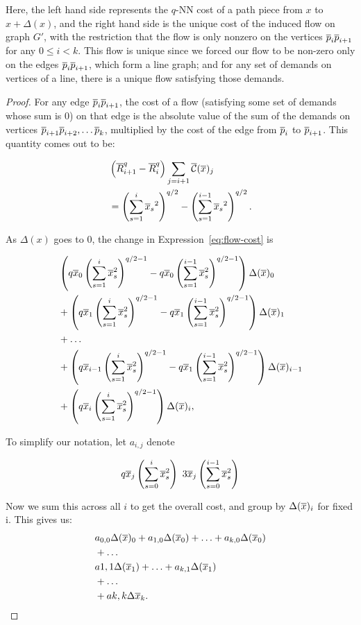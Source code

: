 Here, the left hand side represents the $q$-NN cost of a path piece from
$x$ to $x+\Delta(x)$, and the right hand side is the unique cost of the
induced flow on graph $G'$, with the restriction that the flow is only
nonzero on the vertices $\overline{p}_i\overline{p}_{i+1}$ for any $0 \leq i < k$. This flow
is unique since we forced our flow to be non-zero only on the edges
$\overline{p}_i\overline{p}_{i+1}$, which form a line graph; and for any set of demands on
vertices of a line, there is a unique flow satisfying those demands.

\begin{proof} For any edge $\overline{p}_i\overline{p}_{i+1}$, the cost of a flow (satisfying
some set of demands whose sum is $0$) on that edge is the absolute value of
the sum of the demands on vertices $\overline{p}_{i+1} \overline{p}_{i+2}, \ldots \overline{p}_k$,
multiplied by the cost of the edge from $\overline{p}_i$ to $\overline{p}_{i+1}$. This
quantity comes out to be:

\begin{align} &\left(\overline{R}_{i+1}^q-\overline{R}_{i}^q \right) \sum_{j=i+1} \overline{\mathcal{C}}(\overline{x})_j
\\
\label{eq:flow-cost}
&=\left(\sum_{s=1}^i {\overline{x}_s}^2\right)^{q/2} -\left(\sum_{s=1}^{i-1}
{\overline{x}_s}^2\right)^{q/2}.
\end{align}

As $\Delta(x)$ goes to $0$, the change in Expression~\ref{eq:flow-cost} is

\begin{align}
&
\left(q\overline{x}_0 \left(\sum_{s=1}^i \overline{x}_s^2 \right)^{q/2-1} -
q\overline{x}_0\left(\sum_{s=1}^{i-1} \overline{x}_s^2 \right)^{q/2-1} \right) \Delta(\overline{x})_0
\\
&+
\left(q\overline{x}_1 \left(\sum_{s=1}^i \overline{x}_s^2 \right)^{q/2-1} -
q\overline{x}_1\left(\sum_{s=1}^{i-1}\overline{x}_s^2 \right)^{q/2-1} \right) \Delta(\overline{x})_1
\\
&+ \ldots
\\
&+
\left(q\overline{x}_{i-1} \left(\sum_{s=1}^i \overline{x}_s^2 \right)^{q/2-1} -
q\overline{x}_1\left(\sum_{s=1}^{i-1}\overline{x}_s^2 \right)^{q/2-1}
\right)\Delta(\overline{x})_{i-1}
\\
&+
\left(q\overline{x}_i \left(\sum_{s=1}^i \overline{x}_s^2
\right)^{q/2-1}\right)\Delta(\overline{x})_i,
\end{align}

To simplify our notation, let $a_{i,j}$ denote

\[
q\overline{x}_j\left(\sum_{s=0}^i \overline{x}_s^2\right) \ 3\overline{x}_j\left(\sum_{s=0}^{i-1}
\overline{x}_s^2 \right)
\]

Now we sum this across all $i$ to get the overall cost, and group by
$\Delta(\overline{x})_i$ for fixed i. This gives us:
\begin{align}
&a_{0,0} \Delta(\overline{x})_0 + a_{1,0} \Delta(\overline{x}_0) + \ldots + a_{k, 0}
\Delta(\overline{x}_0)
\\
&+ \ldots
\\
&a{1,1} \Delta(\overline{x}_1) + \ldots + a_{k, 1} \Delta(\overline{x}_1)
\\
&+ \ldots
\\
&+ a{k,k} \Delta{\overline{x}_k}.
\end{align}


\end{proof}
